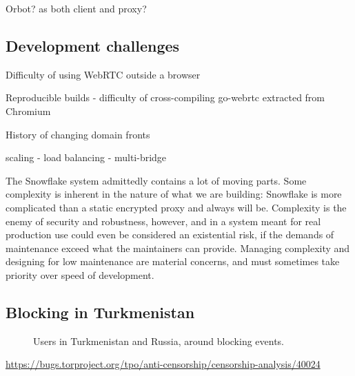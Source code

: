 \documentclass[letterpaper,twocolumn]{article}
\begin{document}
Orbot? as both client and proxy?

\subsection{Development challenges}


Difficulty of using WebRTC outside a browser

Reproducible builds
- difficulty of cross-compiling go-webrtc extracted from Chromium

History of changing domain fronts

scaling
- load balancing
- multi-bridge

The Snowflake system
admittedly contains a lot of moving parts.
Some complexity is inherent in the nature
of what we are building:
Snowflake is more complicated than a static encrypted proxy
and always will be.
Complexity is the enemy of security and robustness, however,
and in a system meant for real production use
could even be considered an existential risk,
if the demands of maintenance exceed what the maintainers can provide.
Managing complexity and designing for low maintenance
are material concerns,
and must sometimes take priority over speed of development.



\subsection{Blocking in Turkmenistan}
\label{sec:block-tm}

\begin{figure}
\caption{
Users in Turkmenistan and Russia,
around blocking events.
}
\label{fig:user-counts-tm-ru}
\end{figure}


\url{https://bugs.torproject.org/tpo/anti-censorship/censorship-analysis/40024}
\end{document}
